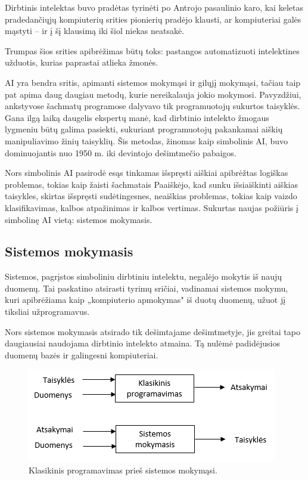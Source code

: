 \documentclass{VUMIFInfKursinis}
\begin{document}
Dirbtinis intelektas buvo pradėtas tyrinėti po Antrojo pasaulinio karo, kai keletas pradedančiųjų kompiuterių srities pionierių pradėjo klausti, ar kompiuteriai galės mąstyti – ir į šį klausimą iki šiol niekas neatsakė.
\par
Trumpas šios srities apibrėžimas būtų toks: pastangos automatizuoti intelektines užduotis, kurias paprastai atlieka žmonės.
\par
AI yra bendra sritis, apimanti sistemos mokymąsi ir gilųjį mokymąsi, tačiau taip pat apima daug daugiau metodų, kurie nereikalauja jokio mokymosi. Pavyzdžiui, ankstyvose šachmatų programose dalyvavo tik programuotojų sukurtos taisyklės. Gana ilgą laiką daugelis ekspertų manė, kad dirbtinio intelekto žmogaus lygmeniu būtų galima pasiekti, sukuriant programuotojų pakankamai aiškių manipuliavimo žinių taisyklių. Šis metodas, žinomas kaip simbolinis AI, buvo dominuojantis nuo 1950 m. iki devintojo dešimtmečio pabaigos. 
\par
Nors simbolinis AI pasirodė esąs tinkamas išspręsti aiškiai apibrėžtas logiškas problemas, tokias kaip žaisti šachmatais Paaiškėjo, kad sunku išsiaiškinti aiškias taisykles, skirtas išspręsti sudėtingesnes, neaiškias problemas, tokias kaip vaizdo klasifikavimas, kalbos atpažinimas ir kalbos vertimas. Sukurtas naujas požiūris į simbolinę AI vietą: sistemos mokymasis. \cite{1}

\subsection{Sistemos mokymasis}

Sistemos, pagrįstos simboliniu dirbtiniu intelektu, negalėjo mokytis iš naujų duomenų. Tai paskatino atsirasti tyrimų sričiai, vadinamai sistemos mokymu, kuri apibrėžiama kaip „kompiuterio apmokymas" iš duotų duomenų, užuot jį tiksliai užprogramavus.
\par
Nors sistemos mokymasis atsirado tik dešimtajame dešimtmetyje, jis greitai tapo daugiausiai naudojama dirbtinio intelekto atmaina. Tą nulėmė padidėjusios duomenų bazės ir galingesni kompiuteriai.


\vspace{10mm}
\begin{figure}[h!]
\centering
  \includegraphics[scale=1.1]{img/figure_1-2}
  \caption{Klasikinis programavimas prieš sistemos mokymąsi.}
\end{figure}
\vspace{10mm}
\end{document}
